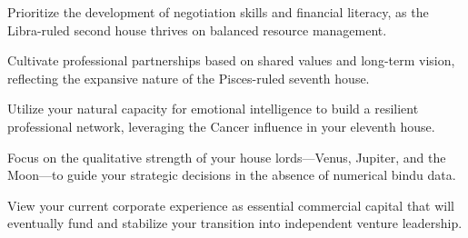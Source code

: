 \begin{diamondlist}
  \item {\fontsize{8.5}{12}\selectfont Prioritize the development of negotiation skills and financial literacy, as the Libra-ruled second house thrives on balanced resource management.}
  \item {\fontsize{8.5}{12}\selectfont Cultivate professional partnerships based on shared values and long-term vision, reflecting the expansive nature of the Pisces-ruled seventh house.}
  \item {\fontsize{8.5}{12}\selectfont Utilize your natural capacity for emotional intelligence to build a resilient professional network, leveraging the Cancer influence in your eleventh house.}
  \item {\fontsize{8.5}{12}\selectfont Focus on the qualitative strength of your house lords---Venus, Jupiter, and the Moon---to guide your strategic decisions in the absence of numerical bindu data.}
  \item {\fontsize{8.5}{12}\selectfont View your current corporate experience as essential commercial capital that will eventually fund and stabilize your transition into independent venture leadership.}
\end{diamondlist}


